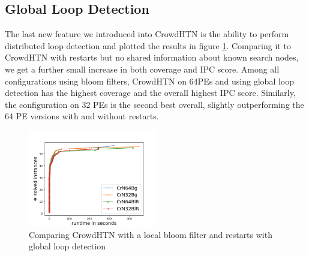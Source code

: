 \subsection{Global Loop Detection}
\label{eval: global loop}
The last new feature we introduced into CrowdHTN is the ability to perform distributed loop detection and plotted the results in figure \ref{figure: global loops}. Comparing it to CrowdHTN with restarts but no shared information about known search nodes, we get a further small increase in both coverage and IPC score. Among all configurations using bloom filters, CrowdHTN on 64PEs and using global loop detection has the highest coverage and the overall highest IPC score. Similarly, the configuration on 32 PEs is the second best overall, slightly outperforming the 64 PE versions with and without restarts.

\begin{figure}[!hbp]
	\caption{Comparing CrowdHTN with a local bloom filter and restarts with global loop detection}
	\label{figure: global loops}
	\centering
	\includegraphics[width=0.5\textwidth]{images/final/global_loops}
\end{figure}

